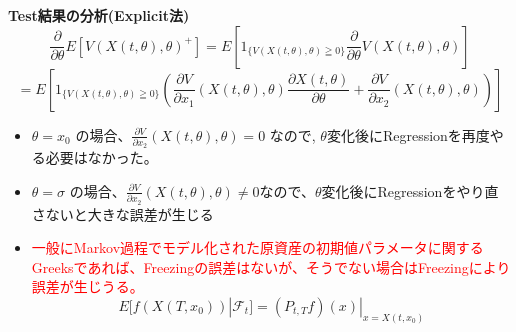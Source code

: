 \documentclass[driverfallback=dvipdfmx,cjk]{beamer}
\begin{document}
\begin{frame}\textbf{Test結果の分析(Explicit法)}
    $$ \frac{\partial}{\partial \theta} E[V\left(X(t, \theta ), \theta \right)^+ ] = E[ 1_{\{  V\left(X(t, \theta), \theta\right) \geqq 0 \} }  \frac{\partial}{\partial \theta} V\left(X(t, \theta) , \theta \right)] $$
    $$= E[ 1_{\{  V\left(X(t, \theta), \theta\right) \geqq 0 \} }  \left(\frac{\partial V}{\partial x_1} \left(X(t, \theta) , \theta \right)\frac{\partial X(t, \theta)}{\partial \theta}  + \frac{\partial V}{\partial x_2} \left(X(t, \theta) , \theta \right)\right) ] $$
    \begin{itemize}
        \item $\theta = x_0$ の場合、$\frac{\partial V}{\partial x_2} \left(X(t, \theta) , \theta \right) = 0$ なので, $\theta$変化後にRegressionを再度やる必要はなかった。
        \item $\theta = \sigma$ の場合、$\frac{\partial V}{\partial x_2} \left(X(t, \theta) , \theta \right) \ne 0$なので、$\theta$変化後にRegressionをやり直さないと大きな誤差が生じる
        \item \textcolor{red}{一般にMarkov過程でモデル化された原資産の初期値パラメータに関するGreeksであれば、Freezingの誤差はないが、そうでない場合はFreezingにより誤差が生じうる。}
        $$ E[f(X(T, x_0))|\mathcal{F}_t] = (P_{t,T}f)(x)|_{x = X(t, x_0)}$$
    \end{itemize}
\end{frame}
\end{document}
